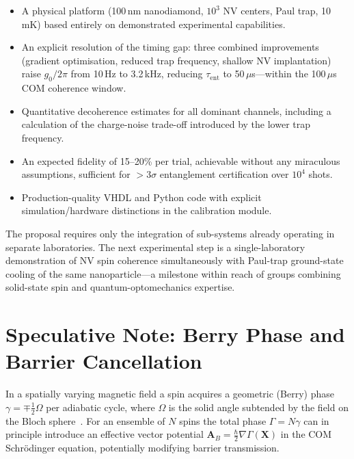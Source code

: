 \documentclass[12pt,a4paper]{article}
\begin{document}
\begin{itemize}
\item A physical platform (100\,nm nanodiamond, $10^3$ NV centers, Paul trap,
      10\,mK) based entirely on demonstrated experimental capabilities.
\item An explicit resolution of the timing gap: three combined improvements
      (gradient optimisation, reduced trap frequency, shallow NV implantation)
      raise $g_0/2\pi$ from 10\,Hz to 3.2\,kHz, reducing $\tau_{\mathrm{ent}}$
      to 50\,$\mu$s---within the 100\,$\mu$s COM coherence window.
\item Quantitative decoherence estimates for all dominant channels, including
      a calculation of the charge-noise trade-off introduced by the lower trap
      frequency.
\item An expected fidelity of 15--20\% per trial, achievable without any
      miraculous assumptions, sufficient for $> 3\sigma$ entanglement
      certification over $10^4$ shots.
\item Production-quality VHDL and Python code with explicit simulation/hardware
      distinctions in the calibration module.
\end{itemize}

The proposal requires only the integration of sub-systems already operating in
separate laboratories. The next experimental step is a single-laboratory
demonstration of NV spin coherence simultaneously with Paul-trap ground-state
cooling of the same nanoparticle---a milestone within reach of groups combining
solid-state spin and quantum-optomechanics expertise.

\appendix
\section{Speculative Note: Berry Phase and Barrier Cancellation}
\label{app:berry}

In a spatially varying magnetic field a spin acquires a geometric (Berry) phase
$\gamma = \mp \frac{1}{2}\Omega$ per adiabatic cycle, where $\Omega$ is the
solid angle subtended by the field on the Bloch sphere~\cite{Berry1984}. For an
ensemble of $N$ spins the total phase $\Gamma = N\gamma$ can in principle
introduce an effective vector potential $\mathbf{A}_B = \frac{\hbar}{2}
\nabla\Gamma(\mathbf{X})$ in the COM Schr\"odinger equation, potentially
modifying barrier transmission.
\end{document}

